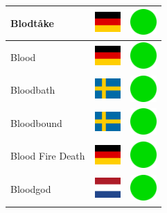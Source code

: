 \documentclass[12pt, a4paper, twoside]{report}
\begin{document}
\begin{center}
\begin{longtable}{|p{5cm}|p{2cm}|p{2cm}|}
 Blodtåke                                                   & \includegraphics[width=1cm]{../4x3/de} &   \includegraphics[width=1cm]{../likes/y} \\ \hline
 Blood                                                      & \includegraphics[width=1cm]{../4x3/de} &   \includegraphics[width=1cm]{../likes/y} \\ \hline
 Bloodbath                                                  & \includegraphics[width=1cm]{../4x3/se} &   \includegraphics[width=1cm]{../likes/y} \\ \hline
 Bloodbound                                                 & \includegraphics[width=1cm]{../4x3/se} &   \includegraphics[width=1cm]{../likes/y} \\ \hline
 Blood Fire Death                                           & \includegraphics[width=1cm]{../4x3/de} &   \includegraphics[width=1cm]{../likes/y} \\ \hline
 Bloodgod                                                   & \includegraphics[width=1cm]{../4x3/nl} &   \includegraphics[width=1cm]{../likes/y} \\ \hline

\end{longtable}
\end{center}
\end{document}
